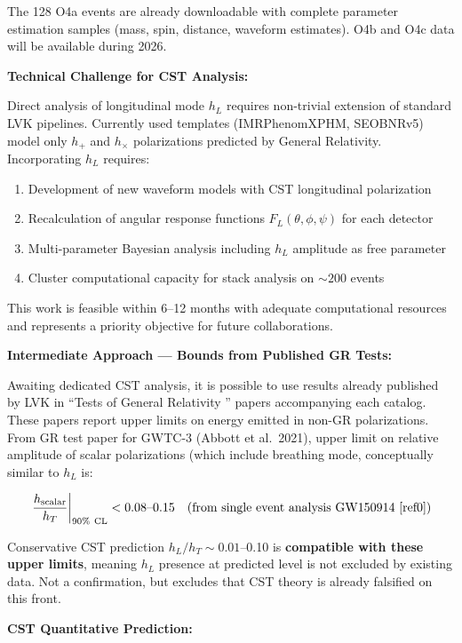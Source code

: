 \documentclass[10pt,a4paper]{article}
\providecommand{\tightlist}{\setlength{\itemsep}{0pt}\setlength{\parskip}{0pt}}
\begin{document}
The 128 O4a events are already downloadable with complete parameter
estimation samples (mass, spin, distance, waveform estimates). O4b and
O4c data will be available during 2026.

\textbf{Technical Challenge for CST Analysis:}

Direct analysis of longitudinal mode \(h_L\) requires non-trivial
extension of standard LVK pipelines. Currently used templates
(IMRPhenomXPHM, SEOBNRv5) model only \(h_+\) and \(h_\times\)
polarizations predicted by General Relativity. Incorporating \(h_L\)
requires:

\begin{enumerate}
\def\labelenumi{\arabic{enumi}.}
\tightlist
\item
  Development of new waveform models with CST longitudinal polarization
\item
  Recalculation of angular response functions \(F_L(\theta,\phi,\psi)\)
  for each detector
\item
  Multi-parameter Bayesian analysis including \(h_L\) amplitude as free
  parameter
\item
  Cluster computational capacity for stack analysis on \(\sim 200\)
  events
\end{enumerate}

This work is feasible within 6--12 months with adequate computational
resources and represents a priority objective for future collaborations.

\textbf{Intermediate Approach --- Bounds from Published GR Tests:}

Awaiting dedicated CST analysis, it is possible to use results already
published by LVK in ``Tests of General Relativity \cite{ref2}'' papers accompanying
each catalog. These papers report upper limits on energy emitted in
non-GR polarizations. From GR test paper for GWTC-3 \cite{ref1} (Abbott et
al.~2021), upper limit on relative amplitude of scalar polarizations
(which include breathing mode, conceptually similar to \(h_L\) is:

\[\left.\frac{h_{\rm scalar}}{h_T}\right|_{\rm 90\%~CL} < 0.08\text{--}0.15 \quad \text{(from single event analysis GW150914 \cite{ref0})}\]

Conservative CST prediction \(h_L/h_T \sim 0.01\)--0.10 is
\textbf{compatible with these upper limits}, meaning \(h_L\) presence at
predicted level is not excluded by existing data. Not a confirmation,
but excludes that CST theory is already falsified on this front.

\textbf{CST Quantitative Prediction:}
\end{document}
